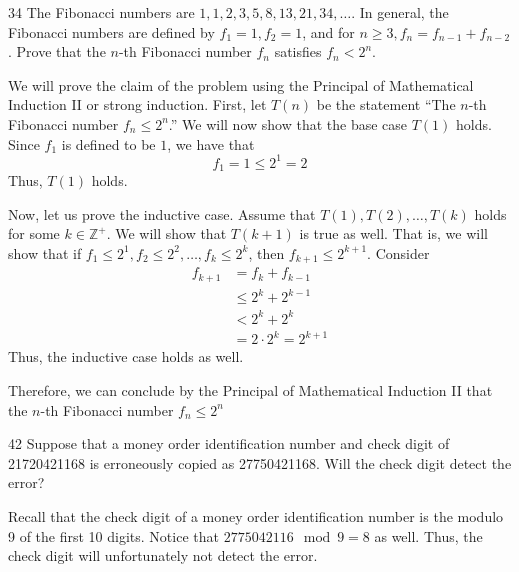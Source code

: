 \begin{hwproblem}
{34}{
    The Fibonacci numbers are $1,1,2,3,5,8,13,21,34, \ldots$. In general, the Fibonacci numbers are defined by $f_1=1, f_2=1$, and for $n \geq 3, f_n=f_{n-1}+f_{n-2}$. Prove that the $n$-th Fibonacci number $f_n$ satisfies $f_n<2^n$.
}
    
We will prove the claim of the problem using the Principal of Mathematical Induction II or strong induction. First, let \(T(n)\) be the statement ``The \(n\)-th Fibonacci number \(f_n \leq 2^n\).'' We will now show that the base case \(T(1)\) holds. Since \(f_1\) is defined to be \(1\), we have that
\[ f_1 = 1 \leq 2^1 = 2 \]
Thus, \(T(1)\) holds.

Now, let us prove the inductive case. Assume that \(T(1), T(2), \ldots, T(k)\) holds for some \(k \in \mathbb{Z}^+\). We will show that \(T(k+1)\) is true as well. That is, we will show that if \(f_1 \leq 2^1, f_2 \leq 2^2, \ldots, f_k \leq 2^k\), then \(f_{k+1} \leq 2^{k+1}\). Consider
\[
\begin{aligned}
    f_{k+1} &= f_{k} + f_{k-1} \\
            &\leq 2^k + 2^{k-1} \\
            &< 2^k + 2^k \\
            &= 2 \cdot 2^{k} = 2^{k+1}
\end{aligned}
\]
Thus, the inductive case holds as well.

Therefore, we can conclude by the Principal of Mathematical Induction II that the \(n\)-th Fibonacci number \(f_n \leq 2^n\)
\end{hwproblem}

\begin{hwproblem}
{42}{
    Suppose that a money order identification number and check digit of 21720421168 is erroneously copied as 27750421168. Will the check digit detect the error?
}
    
Recall that the check digit of a money order identification number is the modulo 9 of the first 10 digits. Notice that \(2775042116 \mod 9 = 8\) as well. Thus, the check digit will unfortunately not detect the error.
\end{hwproblem}

